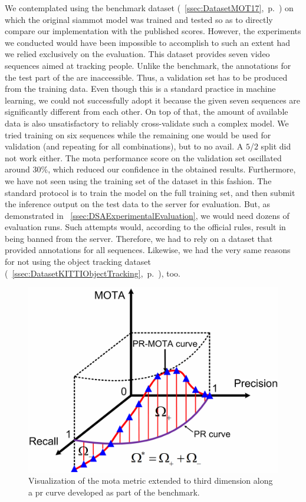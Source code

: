 We contemplated using the \motseventeen{} benchmark dataset (\sectiontext{}~\ref{ssec:DatasetMOT17},~p.~\pageref{ssec:DatasetMOT17}) on which the original \gls{siammot} model was trained and tested so as to directly compare our implementation with the published scores. However, the experiments we conducted would have been impossible to accomplish to such an extent had we relied exclusively on the \motseventeen{} evaluation. This dataset provides seven video sequences aimed at tracking people. Unlike the \uadetrac{} benchmark, the annotations for the test part of the \motseventeen{} are inaccessible. Thus, a validation set has to be produced from the training data. Even though this is a standard practice in machine learning, we could not successfully adopt it because the given seven sequences are significantly different from each other. On top of that, the amount of available data is also unsatisfactory to reliably cross-validate such a complex model. We tried training on six sequences while the remaining one would be used for validation (and repeating for all combinations), but to no avail. A $5$/$2$ split did not work either. The \gls{mota} performance score on the validation set oscillated around $30$\%, which reduced our confidence in the obtained results. Furthermore, we have not seen using the training set of the \motseventeen{} dataset in this fashion. The standard protocol is to train the model on the full training set, and then submit the inference output on the test data to the server for evaluation. But, as demonstrated in \sectiontext{}~\ref{ssec:DSAExperimentalEvaluation}, we would need dozens of evaluation runs. Such attempts would, according to the official rules, result in being banned from the server. Therefore, we had to rely on a dataset that provided annotations for all sequences. Likewise, we had the very same reasons for not using the \kitti{} object tracking dataset (\sectiontext{}~\ref{ssec:DatasetKITTIObjectTracking},~p.~\pageref{ssec:DatasetKITTIObjectTracking}), too.

\begin{figure}[t]
    \centerline{\includegraphics[width=0.5\linewidth]{figures/siamese_tracking/pr_mota_curve.pdf}}
    \caption[Visualization of \gls{mota} along a \gls{pr} curve]{Visualization of the \gls{mota} metric extended to third dimension along a \gls{pr} curve developed as part of the \uadetrac{} benchmark. }
    \label{fig:PRMOTAVisualization}
\end{figure}


